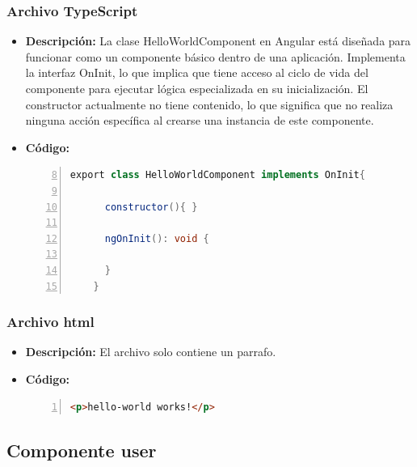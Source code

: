 \documentclass{article}
\begin{document}
  \subsubsection{Archivo TypeScript}
  \begin{itemize}
    \item \textbf{Descripción: }La clase HelloWorldComponent en Angular está diseñada para funcionar 
    como un componente básico dentro de una aplicación. Implementa la interfaz OnInit, lo que implica 
    que tiene acceso al ciclo de vida del componente para ejecutar lógica especializada en su inicialización. 
    El constructor actualmente no tiene contenido, lo que significa que no realiza ninguna acción específica 
    al crearse una instancia de este componente.
    \item \textbf{Código: }
    \begin{lstlisting}[language=java, numbers=left, firstnumber=8, numberstyle=\color{black}]
    export class HelloWorldComponent implements OnInit{
  
      constructor(){ }
      
      ngOnInit(): void {
        
      }
    }
    \end{lstlisting}
  \end{itemize}
  
  \subsubsection{Archivo html}
  \begin{itemize}
    \item \textbf{Descripción: }El archivo solo contiene un parrafo.
    \item \textbf{Código: }
    \begin{lstlisting}[language=html, numbers=left, firstnumber=1, numberstyle=\color{orange}]
    <p>hello-world works!</p>
    \end{lstlisting}
  \end{itemize}
  

  \subsection{Componente user}
\end{document}
